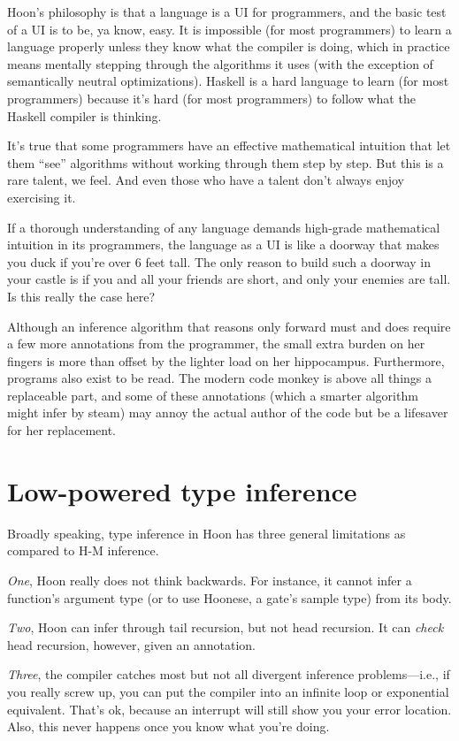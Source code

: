 Hoon's philosophy is that a language is a UI for programmers, and
the basic test of a UI is to be, ya know, easy.  It is impossible
(for most programmers) to learn a language properly unless they
know what the compiler is doing, which in practice means mentally
stepping through the algorithms it uses (with the exception of
semantically neutral optimizations).  Haskell is a hard language
to learn (for most programmers) because it's hard (for most
programmers) to follow what the Haskell compiler is thinking.

It's true that some programmers have an effective mathematical
intuition that let them ``see'' algorithms without working through
them step by step.  But this is a rare talent, we feel.  And
even those who have a talent don't always enjoy exercising it.

If a thorough understanding of any language demands high-grade
mathematical intuition in its programmers, the language as a UI
is like a doorway that makes you duck if you're over 6 feet tall.
The only reason to build such a doorway in your castle is if you
and all your friends are short, and only your enemies are tall.
Is this really the case here?

Although an inference algorithm that reasons only forward must
and does require a few more annotations from the programmer, the
small extra burden on her fingers is more than offset by the
lighter load on her hippocampus.  Furthermore, programs also
exist to be read.  The modern code monkey is above all things a
replaceable part, and some of these annotations (which a smarter
algorithm might infer by steam) may annoy the actual author of
the code but be a lifesaver for her replacement.

\section{Low-powered type inference}

Broadly speaking, type inference in Hoon has three general
limitations as compared to H-M inference.  

\emph{One}, Hoon really does not think backwards. For instance, it
cannot infer a function's argument type (or to use Hoonese, a
gate's sample type) from its body.  

\emph{Two}, Hoon can infer through tail recursion, but not head
recursion.  It can \emph{check} head recursion, however, given an
annotation.

\emph{Three}, the compiler catches most but not all divergent
inference problems---i.e., if you really screw up, you can put the
compiler into an infinite loop or exponential equivalent.  That's
ok, because an interrupt will still show you your error location.
Also, this never happens once you know what you're doing.

